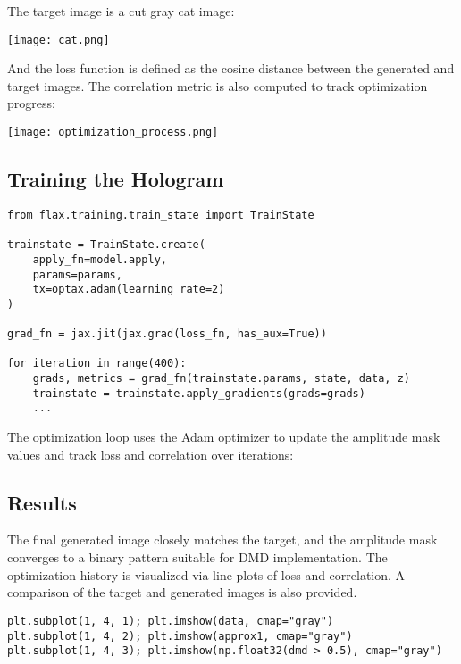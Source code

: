 \documentclass[a4paper,12pt]{report}
\begin{document}
The target image is a cut gray cat image:

\begin{center}
  \texttt{[image: cat.png]}
\end{center}

And the loss function is defined as the cosine distance between the generated and target images. The correlation metric is also computed to track optimization progress:

\begin{center}
  \texttt{[image: optimization\_process.png]}
\end{center}

\subsection{Training the Hologram}

\begin{verbatim}
from flax.training.train_state import TrainState

trainstate = TrainState.create(
    apply_fn=model.apply,
    params=params,
    tx=optax.adam(learning_rate=2)
)

grad_fn = jax.jit(jax.grad(loss_fn, has_aux=True))

for iteration in range(400):
    grads, metrics = grad_fn(trainstate.params, state, data, z)
    trainstate = trainstate.apply_gradients(grads=grads)
    ...
\end{verbatim}

The optimization loop uses the Adam optimizer to update the amplitude mask values and track loss and correlation over iterations:

\subsection{Results}

The final generated image closely matches the target, and the amplitude mask converges to a binary pattern suitable for DMD implementation. The optimization history is visualized via line plots of loss and correlation. A comparison of the target and generated images is also provided.

\begin{verbatim}
plt.subplot(1, 4, 1); plt.imshow(data, cmap="gray")
plt.subplot(1, 4, 2); plt.imshow(approx1, cmap="gray")
plt.subplot(1, 4, 3); plt.imshow(np.float32(dmd > 0.5), cmap="gray")
\end{verbatim}
\end{document}
